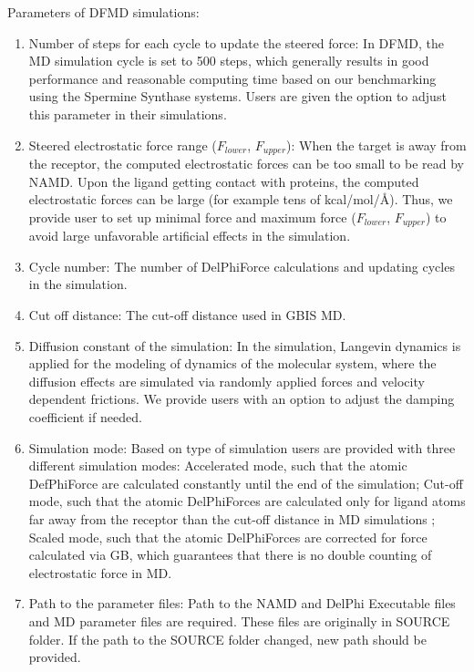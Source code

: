 \documentclass[9pt,tutorial]{livecoms}
\begin{document}
Parameters of DFMD simulations:
\begin{enumerate}
\item Number of steps for each cycle to update the steered force: In DFMD, the MD simulation cycle is set to 500 steps, which generally results in good performance and reasonable computing time based on our benchmarking using the Spermine Synthase systems. Users are given the option to adjust this parameter in their simulations.

\item Steered electrostatic force range ($ F_{lower} $, $ F_{upper} $): When the target is away from the receptor, the computed electrostatic forces can be too small to be read by NAMD. Upon the ligand getting contact with proteins, the computed electrostatic forces can be large (for example tens of kcal/mol/Å). Thus, we provide user to set up minimal force and maximum force ($ F_{lower} $, $ F_{upper}$) to avoid large unfavorable artificial effects in the simulation.

\item Cycle number: The number of DelPhiForce calculations and updating cycles in the simulation.

\item Cut off distance: The cut-off distance used in GBIS MD.

\item Diffusion constant of the simulation: In the simulation, Langevin dynamics is applied for the modeling of dynamics of the molecular system, where the diffusion effects are simulated via randomly applied forces and velocity dependent frictions. We provide users with an option to adjust the damping coefficient if needed.

\item Simulation mode: Based on type of simulation users are provided with three different simulation modes: Accelerated mode, such that the atomic DefPhiForce are calculated constantly until the end of the simulation; Cut-off mode, such that the atomic DelPhiForces are calculated only for ligand atoms far away from the receptor than the cut-off distance in MD simulations ; Scaled mode, such that the atomic DelPhiForces are corrected for force calculated via GB, which guarantees that there is no double counting of electrostatic force in MD.

\item Path to the parameter files: Path to the NAMD and DelPhi Executable files and MD parameter files are required. These files are originally in SOURCE folder. If the path to the SOURCE folder changed, new path should be provided.


\end{enumerate}
\end{document}
